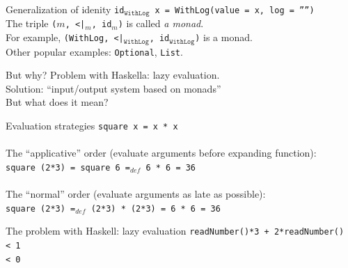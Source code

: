 \documentclass{beamer}
\begin{document}
\begin{frame}{Generalization of idenity}
  \texttt{id$_\mathtt{WithLog}$ x = WithLog(value = x, log = '''')} \\ \pause
  The triple \texttt{($m$, <|$_m$, id$_m$)} is called \textit{a monad}. \\ \pause
  For example, \texttt{(WithLog, <|$_\mathtt{WithLog}$, id$_\mathtt{WithLog}$)}
  is a monad. \\ \pause
  Other popular examples: \texttt{Optional}, \texttt{List}.


\end{frame}

\begin{frame}{But why?}
  \pause
  Problem with Haskella: lazy evaluation. \\ \pause
  Solution: ``input/output system based on monads'' \\ \pause
  But what does it mean?
\end{frame}

\begin{frame}{Evaluation strategies}
  \texttt{square x = x * x} \\ \pause
  \ \\
  The ``applicative'' order (evaluate arguments before expanding function): \\ \pause
  \texttt{square (2*3) \pause = square 6 \pause =$_{def}$ 6 * 6 \pause = 36} \\ \pause
  \ \\
  The ``normal'' order (evaluate arguments as late as possible): \\ \pause
  \texttt{square (2*3) \pause =$_{def}$ (2*3) * (2*3) \pause = 6 * 6 \pause = 36}
\end{frame}


\begin{frame}{The problem with Haskell: lazy evaluation}
  \texttt{readNumber()*3 + 2*readNumber()} \\ \pause
  \texttt{\phantom{}< 1} \\ \pause
  \texttt{\phantom{}< 0} \\  
\end{frame}
\end{document}
